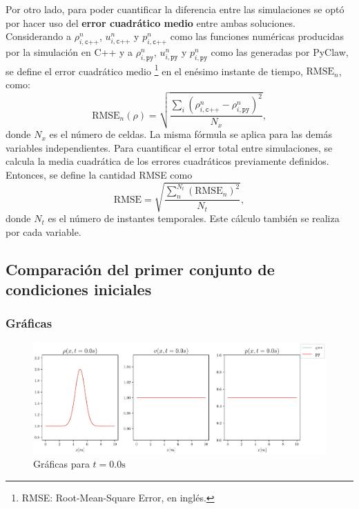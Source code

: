 Por otro lado, para poder cuantificar la diferencia entre las simulaciones se optó por hacer uso del \textbf{error cuadrático medio} entre ambas soluciones. Considerando a $\rho_{i,\texttt{c++}}^{n}$, $u_{i,\texttt{c++}}^{n}$ y $p_{i,\texttt{c++}}^{n}$ como las funciones numéricas producidas por la simulación en C++ y a $\rho_{i,\texttt{py}}^{n}$, $u_{i,\texttt{py}}^{n}$ y $p_{i,\texttt{py}}^{n}$ como las generadas por PyClaw, se define el error cuadrático medio \footnote{RMSE: Root-Mean-Square Error, en inglés.} en el enésimo instante de tiempo, $\text{RMSE}_n$, como:
\begin{equation}
	\text{RMSE}_n(\rho) = \sqrt{\frac{\sum_{i}(\rho_{i,\texttt{c++}}^{n} - \rho_{i,\texttt{py}}^{n})^{2}}{N_x}},
\end{equation}
donde $N_x$ es el número de celdas. La misma fórmula se aplica para las demás variables independientes. Para cuantificar el error total entre simulaciones, se calcula la media cuadrática de los errores cuadráticos previamente definidos. Entonces, se define la cantidad RMSE como
\begin{equation}
	\text{RMSE} = \sqrt{\frac{\sum_{n}^{N_{t}} (\text{RMSE}_{n})^{2}}{N_t}},
\end{equation}
donde $N_t$ es el número de instantes temporales. Este cálculo también se realiza por cada variable.
\subsection{Comparación del primer conjunto de condiciones iniciales}
\subsubsection{Gráficas}
\begin{figure}[ht]
	\centering
	\includegraphics[width=1.1\linewidth]{../euler1D/plots_en_TDG/py_sin_claw/py_gauss199/1.pdf}
	\caption{Gráficas para $t=0.0\unit{\s}$}
\end{figure}

